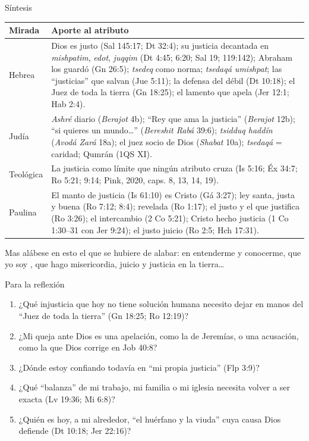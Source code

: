 \begin{frame}{Síntesis}
\scriptsize\renewcommand{\arraystretch}{1.18}
\begin{tabular}{@{}>{\RaggedRight\arraybackslash}p{1.6cm}>{\RaggedRight\arraybackslash}p{10.6cm}@{}}
\toprule
\textbf{Mirada} & \textbf{Aporte al atributo} \\ \midrule
Hebrea & Dios es justo (Sal 145:17; Dt 32:4); su justicia decantada en \emph{mishpatim}, \emph{edot}, \emph{juqqim} (Dt 4:45; 6:20; Sal 19; 119:142); Abraham los guardó (Gn 26:5); \emph{tsedeq} como norma; \emph{tsedaqá umishpat}; las ``justicias'' que salvan (Jue 5:11); la defensa del débil (Dt 10:18); el Juez de toda la tierra (Gn 18:25); el lamento que apela (Jer 12:1; Hab 2:4). \\
Judía & \emph{Ashré} diario (\emph{Berajot} 4b); ``Rey que ama la justicia'' (\emph{Berajot} 12b); ``si quieres un mundo\ldots'' (\emph{Bereshit Rabá} 39:6); \emph{tsidduq haddín} (\emph{Avodá Zará} 18a); el juez socio de Dios (\emph{Shabat} 10a); \emph{tsedaqá} = caridad; Qumrán (1QS XI). \\
Teológica & La justicia como límite que ningún atributo cruza (Is 5:16; Éx 34:7; Ro 5:21; 9:14; Pink, 2020, caps. 8, 13, 14, 19). \\
Paulina & El manto de justicia (Is 61:10) es Cristo (Gá 3:27); ley santa, justa y buena (Ro 7:12; 8:4); revelada (Ro 1:17); el justo y el que justifica (Ro 3:26); el intercambio (2 Co 5:21); Cristo hecho justicia (1 Co 1:30--31 con Jer 9:24); el justo juicio (Ro 2:5; Hch 17:31). \\
\bottomrule
\end{tabular}\par\medskip
\begin{cita}Mas alábese en esto el que se hubiere de alabar: en entenderme y conocerme, que yo soy \SENOR, que hago misericordia, juicio y justicia en la tierra\ldots{}\end{cita}
\end{frame}

\begin{frame}{Para la reflexión}
\small
\begin{enumerate}
\item ¿Qué injusticia que hoy no tiene solución humana necesito dejar en manos del ``Juez de toda la tierra'' (Gn 18:25; Ro 12:19)?
\item ¿Mi queja ante Dios es una apelación, como la de Jeremías, o una acusación, como la que Dios corrige en Job 40:8?
\item ¿Dónde estoy confiando todavía en ``mi propia justicia'' (Flp 3:9)?
\item ¿Qué ``balanza'' de mi trabajo, mi familia o mi iglesia necesita volver a ser exacta (Lv 19:36; Mi 6:8)?
\item ¿Quién es hoy, a mi alrededor, ``el huérfano y la viuda'' cuya causa Dios defiende (Dt 10:18; Jer 22:16)?
\end{enumerate}
\end{frame}

